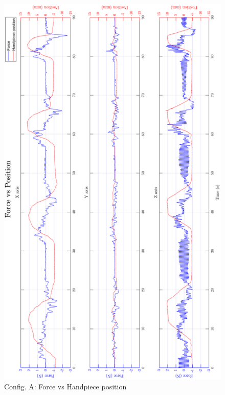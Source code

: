 \begin{figure}[htbp]
\begin{center}
\includegraphics[width=0.9\linewidth]{Images/exp/exp1_1_3.png}
\caption{Config. A: Force vs Handpiece position}
\label{fig: exp1_1_3}
\end{center}
\end{figure}

